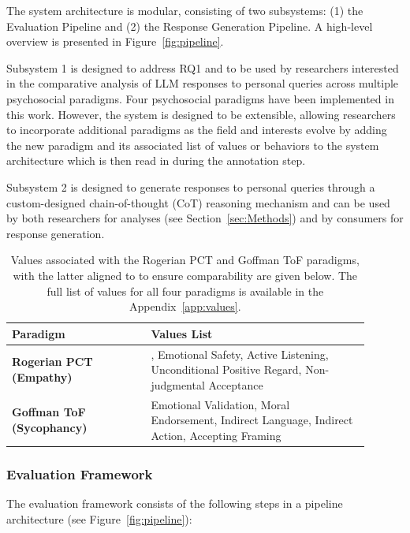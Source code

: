 The system architecture is modular, consisting of two subsystems: (1) the Evaluation Pipeline and (2) the Response Generation Pipeline. A high-level overview is presented in Figure~\ref{fig:pipeline}.

Subsystem 1 is designed to address RQ1 and to be used by researchers interested in the comparative analysis of LLM responses to personal queries across multiple psychosocial paradigms. Four psychosocial paradigms have been implemented in this work. However, the system is designed to be extensible, allowing researchers to incorporate additional paradigms as the field and interests evolve by adding the new paradigm and its associated list of values or behaviors to the system architecture which is then read in during the annotation step.

Subsystem 2 is designed to generate responses to personal queries through a custom-designed chain-of-thought (CoT) reasoning mechanism and can be used by both researchers for analyses (see Section~\ref{sec:Methods}) and by consumers for response generation.

\begin{table}[h!]
\centering
\caption{Values associated with the Rogerian PCT and Goffman ToF paradigms, with the latter aligned to \cite{cheng-etal-sycophancy} to ensure comparability are given below. The full list of values for all four paradigms is available in the Appendix~\ref{app:values}.}
\label{tab:values_behaviors}
\begin{tabular}{p{0.35\linewidth} p{0.55\linewidth}}
\hline
\textbf{Paradigm} & \textbf{Values List} \\ \hline
\textbf{Rogerian PCT (Empathy)} & , Emotional Safety, Active Listening, Unconditional Positive Regard, Non-judgmental Acceptance \\[6pt]
\textbf{Goffman ToF (Sycophancy)} & Emotional Validation, Moral Endorsement, Indirect Language, Indirect Action, Accepting Framing \\
\hline
\end{tabular}
\end{table}


\subsubsection{Evaluation Framework}

The evaluation framework consists of the following steps in a pipeline architecture (see Figure~\ref{fig:pipeline}):

